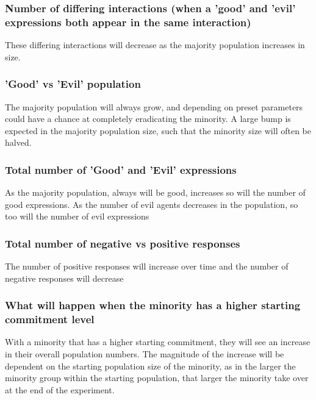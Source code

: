 \documentclass[]{article}
\begin{document}
\subsubsection{Number of differing interactions (when a 'good' and 'evil' expressions both appear in the same interaction)} These differing interactions will decrease as the majority population increases in size.


\subsubsection{'Good' vs 'Evil' population} The majority population will always grow, and depending on preset parameters could have a chance at completely eradicating the minority. A large bump is expected in the majority population size, such that the minority size will often be halved. 



\subsubsection{Total number of 'Good' and 'Evil' expressions} As the majority population, always will be good, increases so will the number of good expressions. As the number of evil agents decreases in the population, so too will the number of evil expressions


\subsubsection{Total number of negative vs positive responses} The number of positive responses will increase over time and the number of negative responses will decrease


\subsubsection{What will happen when the minority has a higher starting commitment level} With a minority that has a higher starting commitment, they will see an increase in their overall population numbers. The magnitude of the increase will be dependent on the starting population size of the minority, as in the larger the minority group within the starting population, that larger the minority take over at the end of the experiment. 
\end{document}
